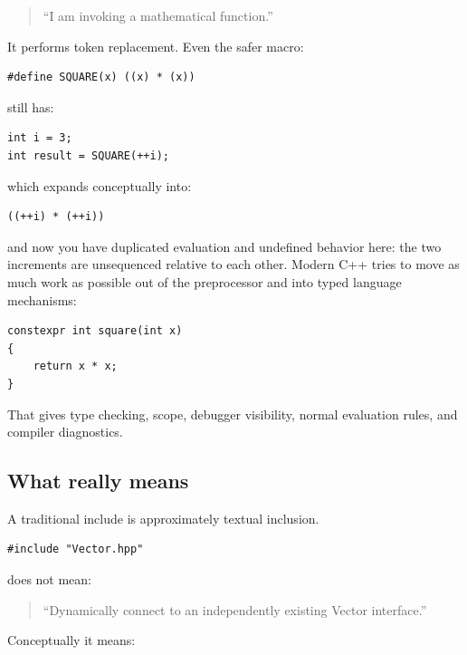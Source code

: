 \begin{quote}
``I am invoking a mathematical function.''
\end{quote}

It performs token replacement. Even the safer macro:

\begin{verbatim}
#define SQUARE(x) ((x) * (x))
\end{verbatim}

still has:

\begin{verbatim}
int i = 3;
int result = SQUARE(++i);
\end{verbatim}

which expands conceptually into:

\begin{verbatim}
((++i) * (++i))
\end{verbatim}

and now you have duplicated evaluation and undefined behavior here: the two increments are unsequenced relative to each other. Modern C++ tries to move as much work as possible out of the preprocessor and into typed language mechanisms:

\begin{verbatim}
constexpr int square(int x)
{
    return x * x;
}
\end{verbatim}

That gives type checking, scope, debugger visibility, normal evaluation rules, and compiler diagnostics.

\subsection{\texorpdfstring{What  really means}{What \#include really means}}\label{05-engine-i-ch002-what-include-really-means}

\hypertarget{05-engine-i-ch002-what-include-really-means}{}

A traditional include is approximately textual inclusion.

\begin{verbatim}
#include "Vector.hpp"
\end{verbatim}

does not mean:

\begin{quote}
``Dynamically connect to an independently existing Vector interface.''
\end{quote}

Conceptually it means:

